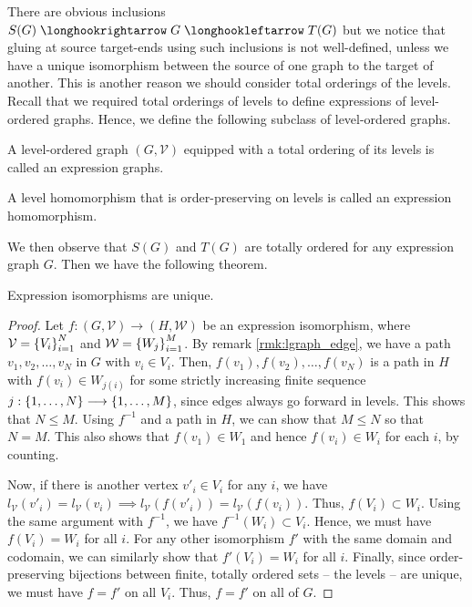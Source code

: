 \documentclass[./Thick_TQFTs_and_Quantum_Information.tex]{subfiles}
\begin{document}
There are obvious inclusions $S(G) \hto G \hot T(G)$ but we notice that gluing
at source target-ends using such inclusions is not well-defined, unless we have
a unique isomorphism between the source of one graph to the target of another.
This is another reason we should consider total orderings of the levels. Recall
that we required total orderings of levels to define expressions of
level-ordered graphs. Hence, we define the following subclass of level-ordered
graphs.

\begin{defn}
A level-ordered graph $(G, \mathcal{V})$ equipped with a total ordering of its
levels is called an expression graphs.
\end{defn}

\begin{defn}
A level homomorphism that is order-preserving on levels is called an expression
homomorphism.
\end{defn}

We then observe that $S(G)$ and $T(G)$ are totally ordered for any expression
graph $G$. Then we have the following theorem.

\begin{thm}\label{thm:expiso_unique}
Expression isomorphisms are unique.
\end{thm}
\begin{proof}
Let $f : (G, \mathcal{V}) \to (H, \mathcal{W})$ be an expression isomorphism,
where $\mathcal{V} = \set{V_i}_{i = 1}^{N}$ and
$\mathcal{W} = \set{W_j}_{i = 1}^{M}$. By remark \ref{rmk:lgraph_edge}, we have
a path $v_1, v_2, \dots, v_N$ in $G$ with $v_i \in V_i$. Then,
$f(v_1), f(v_2), \dots, f(v_N)$ is a path in $H$ with $f(v_i) \in W_{j(i)}$
for some strictly increasing finite sequence
$j : \set{1, \dots, N} \to \set{1, \dots, M}$, since edges always go forward in
levels. This shows that $N \leq M$. Using $f^{-1}$ and a path in $H$, we can
show that $M \leq N$ so that $N = M$. This also shows that $f(v_1) \in W_1$ and
hence $f(v_i) \in W_i$ for each $i$, by counting.

Now, if there is another vertex $v'_i \in V_i$ for any $i$, we have
$l_{\mathcal{V}}(v'_i) = l_{\mathcal{V}}(v_i) \implies
l_{\mathcal{V}}(f(v'_i)) = l_{\mathcal{V}}(f(v_i))$. Thus, $f(V_i) \subset W_i$.
Using the same argument with $f^{-1}$, we have $f^{-1}(W_i) \subset V_i$. Hence,
we must have $f(V_i) = W_i$ for all $i$. For any other isomorphism $f'$ with the
same domain and codomain, we can similarly show that $f'(V_i) = W_i$ for all
$i$. Finally, since order-preserving bijections between finite, totally ordered
sets -- the levels -- are unique, we must have $f = f'$ on all $V_i$. Thus,
$f = f'$ on all of $G$.
\end{proof}
\end{document}
